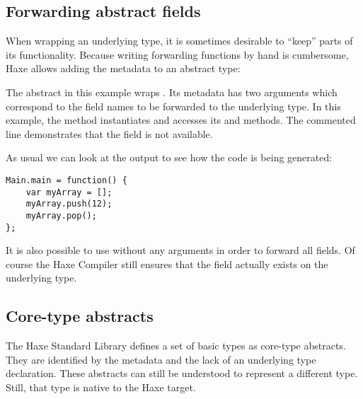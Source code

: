 \subsection{Forwarding abstract fields}
\label{types-abstract-forward}

When wrapping an underlying type, it is sometimes desirable to ``keep'' parts of its functionality. Because writing forwarding functions by hand is cumbersome, Haxe allows adding the  metadata to an abstract type:


The  abstract in this example wraps . Its  metadata has two arguments which correspond to the field names to be forwarded to the underlying type. In this example, the  method instantiates  and accesses its  and  methods. The commented line demonstrates that the  field is not available.

As usual we can look at the  output to see how the code is being generated:

\begin{lstlisting}
Main.main = function() {
	var myArray = [];
	myArray.push(12);
	myArray.pop();
};
\end{lstlisting}

It is also possible to use  without any arguments in order to forward all fields. Of course the Haxe Compiler still ensures that the field actually exists on the underlying type.



\subsection{Core-type abstracts}
\label{types-abstract-core-type}

The Haxe Standard Library defines a set of basic types as core-type abstracts. They are identified by the  metadata and the lack of an underlying type declaration. These abstracts can still be understood to represent a different type. Still, that type is native to the Haxe target. 

